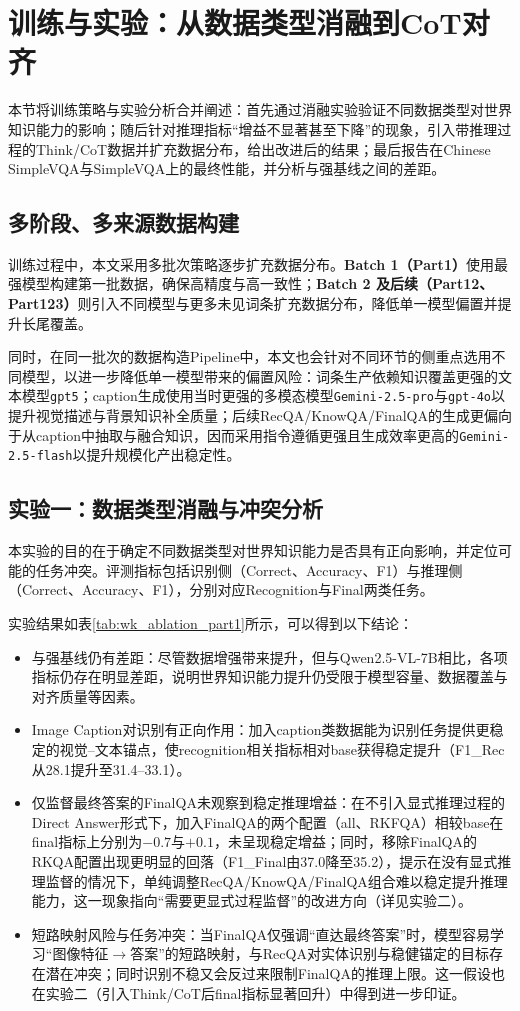 \section{训练与实验：从数据类型消融到CoT对齐}
本节将训练策略与实验分析合并阐述：首先通过消融实验验证不同数据类型对世界知识能力的影响；随后针对推理指标“增益不显著甚至下降”的现象，引入带推理过程的Think/CoT数据并扩充数据分布，给出改进后的结果；最后报告在Chinese SimpleVQA与SimpleVQA上的最终性能，并分析与强基线之间的差距。

\subsection{多阶段、多来源数据构建}
训练过程中，本文采用多批次策略逐步扩充数据分布。\textbf{Batch 1（Part1）}使用最强模型构建第一批数据，确保高精度与高一致性；\textbf{Batch 2 及后续（Part12、Part123）}则引入不同模型与更多未见词条扩充数据分布，降低单一模型偏置并提升长尾覆盖。

同时，在同一批次的数据构造Pipeline中，本文也会针对不同环节的侧重点选用不同模型，以进一步降低单一模型带来的偏置风险：词条生产依赖知识覆盖更强的文本模型\texttt{gpt5}；caption生成使用当时更强的多模态模型\texttt{Gemini-2.5-pro}与\texttt{gpt-4o}以提升视觉描述与背景知识补全质量；后续RecQA/\allowbreak KnowQA/\allowbreak FinalQA的生成更偏向于从caption中抽取与融合知识，因而采用指令遵循更强且生成效率更高的\texttt{Gemini-2.5-flash}以提升规模化产出稳定性。

\subsection{实验一：数据类型消融与冲突分析}
本实验的目的在于确定不同数据类型对世界知识能力是否具有正向影响，并定位可能的任务冲突。评测指标包括识别侧（Correct、Accuracy、F1）与推理侧（Correct、Accuracy、F1），分别对应Recognition与Final两类任务。

实验结果如表\ref{tab:wk_ablation_part1}所示，可以得到以下结论：
\begin{itemize}
  \item 与强基线仍有差距：尽管数据增强带来提升，但与Qwen2.5-VL-7B相比\citep{bai2025qwen25vl}，各项指标仍存在明显差距，说明世界知识能力提升仍受限于模型容量、数据覆盖与对齐质量等因素。
  \item Image Caption对识别有正向作用：加入caption类数据能为识别任务提供更稳定的视觉--文本锚点，使recognition相关指标相对base获得稳定提升（F1\_Rec从28.1提升至31.4--33.1）。
  \item 仅监督最终答案的FinalQA未观察到稳定推理增益：在不引入显式推理过程的Direct Answer形式下，加入FinalQA的两个配置（all、RKFQA）相较base在final指标上分别为$-0.7$与$+0.1$，未呈现稳定增益；同时，移除FinalQA的RKQA配置出现更明显的回落（F1\_Final由37.0降至35.2），提示在没有显式推理监督的情况下，单纯调整RecQA/KnowQA/FinalQA组合难以稳定提升推理能力，这一现象指向“需要更显式过程监督”的改进方向（详见实验二）。
  \item 短路映射风险与任务冲突：当FinalQA仅强调“直达最终答案”时，模型容易学习“图像特征$\rightarrow$答案”的短路映射，与RecQA对实体识别与稳健锚定的目标存在潜在冲突；同时识别不稳又会反过来限制FinalQA的推理上限。这一假设也在实验二（引入Think/CoT后final指标显著回升）中得到进一步印证。
\end{itemize}

